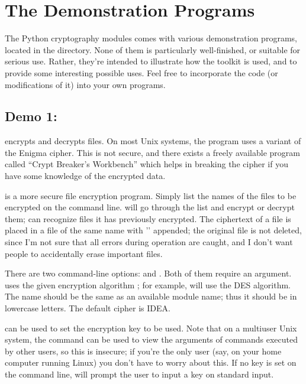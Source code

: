 \documentclass{howto}
\begin{document}
\section{The Demonstration Programs}
The Python cryptography modules comes with various demonstration
programs, located in the  directory.  None of them is
particularly well-finished, or suitable for serious use.  Rather,
they're intended to illustrate how the toolkit is used, and to provide
some interesting possible uses.  Feel free to incorporate the code (or
modifications of it) into your own programs.

\subsection{Demo 1: }

 encrypts and decrypts files.  On most Unix systems, the
 program uses a variant of the Enigma cipher.  This is not
secure, and there exists a freely available program called ``Crypt
Breaker's Workbench'' which helps in breaking the cipher if you have
some knowledge of the encrypted data.

 is a more secure file encryption program.  Simply list
the names of the files to be encrypted on the command line.
 will go through the list and encrypt or decrypt them;
 can recognize files it has previously encrypted.  The
ciphertext of a file is placed in a file of the same name with
'' appended; the original file is not deleted, since I'm
not sure that all errors during operation are caught, and I don't want
people to accidentally erase important files.

There are two command-line options:  and .  Both of
them require an argument.   uses the
given encryption algorithm ; for example,
 will use the DES algorithm.  The name should be the same
as an available module name; thus it should be in lowercase letters.
The default cipher is IDEA.

 can be used to set the encryption key to be
used.  Note that on a multiuser Unix system, the  command can
be used to view the arguments of commands executed by other users, so
this is insecure; if you're the only user (say, on your home computer
running Linux) you don't have to worry about this.  If no key is set
on the command line,  will prompt the user to input a key
on standard input.
\end{document}

